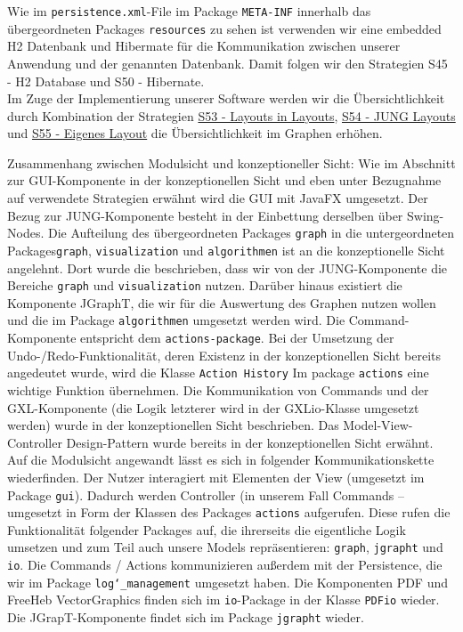 \documentclass[enabledeprecatedfontcommands,fontsize=11pt,paper=a4,twoside]{scrartcl}
\newcounter{one}
\begin{document}
Wie im \texttt{persistence.xml}-File im Package \texttt{META-INF} innerhalb das übergeordneten Packages \texttt{resources} zu sehen ist verwenden wir eine embedded H2 Datenbank und Hibermate für die Kommunikation zwischen unserer Anwendung und der genannten Datenbank. Damit folgen wir den Strategien \hypertarget{ppp}{S45 - H2 Database} und \hypertarget{rrr}{S50 - Hibernate}. \\

Im Zuge der Implementierung unserer Software werden wir die Übersichtlichkeit durch Kombination der Strategien \hyperlink{sss}{S53 - Layouts in Layouts}, \hyperlink{xee}{S54 - JUNG Layouts} und \hyperlink{xff}{S55 - Eigenes Layout} die Übersichtlichkeit im Graphen erhöhen.

Zusammenhang zwischen Modulsicht und konzeptioneller Sicht: Wie im Abschnitt zur GUI-Komponente  in der konzeptionellen Sicht und eben unter Bezugnahme auf verwendete Strategien erwähnt wird die GUI mit JavaFX umgesetzt. Der Bezug zur JUNG-Komponente besteht in der Einbettung derselben über Swing-Nodes. Die Aufteilung des übergeordneten Packages \texttt{graph} in die untergeordneten Packages\texttt{graph}, \texttt{visualization} und \texttt{algorithmen} ist an die konzeptionelle Sicht angelehnt. Dort wurde die beschrieben, dass wir von der JUNG-Komponente die Bereiche \texttt{graph} und \texttt{visualization}  nutzen. Darüber hinaus existiert die Komponente JGraphT, die wir für die Auswertung des Graphen nutzen wollen und die im Package \texttt{algorithmen} umgesetzt werden wird. Die Command-Komponente entspricht dem \texttt{actions-package}. Bei der Umsetzung der Undo-/Redo-Funktionalität, deren Existenz in der konzeptionellen Sicht bereits angedeutet wurde, wird die Klasse \texttt{Action History} Im package \texttt{actions} eine wichtige Funktion übernehmen. Die Kommunikation von Commands und der GXL-Komponente (die Logik letzterer wird in der GXLio-Klasse umgesetzt werden) wurde in der konzeptionellen Sicht beschrieben. Das Model-View-Controller Design-Pattern wurde bereits in der konzeptionellen Sicht erwähnt. Auf die Modulsicht angewandt lässt es sich in folgender Kommunikationskette wiederfinden. Der Nutzer interagiert mit Elementen der View (umgesetzt im Package \texttt{gui}). Dadurch werden Controller (in unserem Fall Commands – umgesetzt in Form der Klassen des Packages \texttt{actions} aufgerufen. Diese rufen die Funktionalität folgender Packages auf, die ihrerseits die eigentliche Logik umsetzen und zum Teil auch unsere Models repräsentieren: \texttt{graph}, \texttt{jgrapht} und \texttt{io}. Die Commands / Actions kommunizieren außerdem mit der Persistence, die wir im Package \texttt{log\char`_management} umgesetzt haben. Die Komponenten PDF und FreeHeb VectorGraphics finden sich im \texttt{io}-Package in der Klasse \texttt{PDFio} wieder. Die JGrapT-Komponente findet sich im Package \texttt{jgrapht}  wieder. \\ \\
\end{document}
